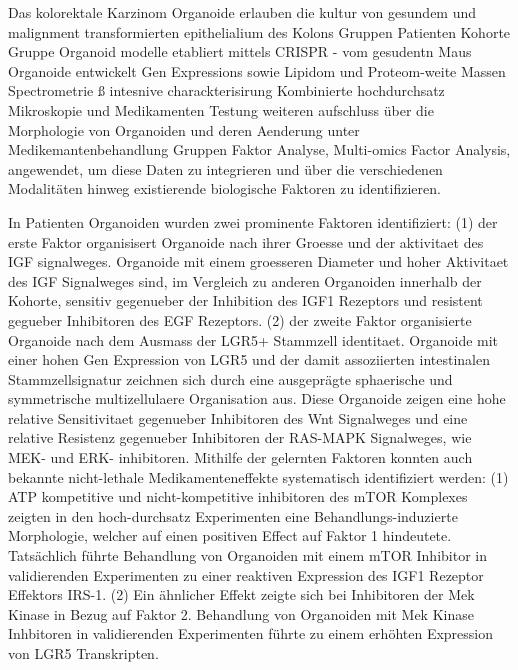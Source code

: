 Das kolorektale Karzinom 
Organoide erlauben die kultur von gesundem und malignment transformierten epithelialium des Kolons
Gruppen Patienten Kohorte
Gruppe Organoid modelle etabliert mittels CRISPR - vom gesudentn Maus Organoide entwickelt
Gen Expressions sowie Lipidom und Proteom-weite Massen Spectrometrie ß intesnive charackterisirung 
Kombinierte hochdurchsatz Mikroskopie und Medikamenten Testung weiteren aufschluss über die Morphologie von Organoiden und deren Aenderung unter Medikemantenbehandlung
Gruppen Faktor Analyse, Multi-omics Factor Analysis, angewendet, um diese Daten zu integrieren und über die verschiedenen Modalitäten hinweg existierende biologische Faktoren zu identifizieren. 

In Patienten Organoiden wurden zwei prominente Faktoren identifiziert: (1) der erste Faktor organisisert Organoide nach ihrer Groesse und der aktivitaet des IGF signalweges. Organoide mit einem groesseren Diameter und hoher Aktivitaet des IGF Signalweges sind, im Vergleich zu anderen Organoiden innerhalb der Kohorte, sensitiv gegenueber der Inhibition des IGF1 Rezeptors und resistent gegueber Inhibitoren des EGF Rezeptors. (2) der zweite Faktor organisierte Organoide nach dem Ausmass der LGR5+ Stammzell identitaet. Organoide mit einer hohen Gen Expression von LGR5 und der damit assoziierten intestinalen Stammzellsignatur zeichnen sich durch eine ausgeprägte sphaerische und symmetrische multizellulaere Organisation aus. Diese Organoide zeigen eine hohe relative Sensitivitaet gegenueber Inhibitoren des Wnt Signalweges und eine relative Resistenz gegenueber Inhibitoren der RAS-MAPK Signalweges, wie MEK- und ERK- inhibitoren. 
Mithilfe der gelernten Faktoren konnten auch bekannte nicht-lethale Medikamenteneffekte systematisch identifiziert werden: (1) ATP kompetitive und nicht-kompetitive inhibitoren des mTOR Komplexes zeigten in den hoch-durchsatz Experimenten eine Behandlungs-induzierte Morphologie, welcher auf einen positiven Effect auf Faktor 1 hindeutete. Tatsächlich führte Behandlung von Organoiden mit einem mTOR Inhibitor in validierenden Experimenten zu einer reaktiven Expression des IGF1 Rezeptor Effektors IRS-1. (2) Ein ähnlicher Effekt zeigte sich bei Inhibitoren der Mek Kinase in Bezug auf Faktor 2. Behandlung von Organoiden mit Mek Kinase Inhbitoren in validierenden Experimenten führte zu einem erhöhten Expression von LGR5 Transkripten.

